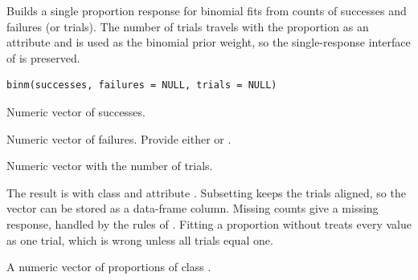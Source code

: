 \documentclass[a4paper]{book}
\begin{document}
%
\begin{Description}\relax
Builds a single proportion response for binomial  fits from
counts of successes and failures (or trials). The number of trials travels with
the proportion as an attribute and is used as the binomial prior weight, so the
single-response interface of  is preserved.
\end{Description}
%
\begin{Usage}
\begin{verbatim}
binm(successes, failures = NULL, trials = NULL)
\end{verbatim}
\end{Usage}
%
\begin{Arguments}
\begin{ldescription}
\item[\code{successes}] Numeric vector of successes.
\item[\code{failures}] Numeric vector of failures. Provide either  or .
\item[\code{trials}] Numeric vector with the number of trials.
\end{ldescription}
\end{Arguments}
%
\begin{Details}\relax
The result is  with class  and attribute
. Subsetting keeps the trials aligned, so the vector can be stored
as a data-frame column. Missing counts give a missing response, handled by the
 rules of . Fitting a proportion without 
treats every value as one trial, which is wrong unless all trials equal one.
\end{Details}
%
\begin{Value}
A numeric vector of proportions of class .
\end{Value}
%
\begin{SeeAlso}\relax
{}
\end{SeeAlso}
%
\begin{Examples}
\end{Examples}
\end{document}
